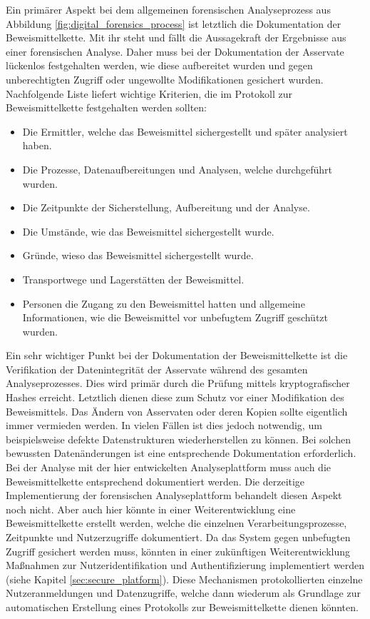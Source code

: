 \noindent
Ein primärer Aspekt bei dem allgemeinen forensischen Analyseprozess aus Abbildung \ref{fig:digital_forensics_process} ist letztlich die Dokumentation der Beweismittelkette. Mit ihr steht und fällt die Aussagekraft der Ergebnisse aus einer forensischen Analyse. Daher muss bei der Dokumentation der Asservate lückenlos festgehalten werden, wie diese aufbereitet wurden und gegen unberechtigten Zugriff oder ungewollte Modifikationen gesichert wurden. Nachfolgende Liste liefert wichtige Kriterien, die im Protokoll zur Beweismittelkette festgehalten werden sollten:
\begin{itemize}
\item Die Ermittler, welche das Beweismittel sichergestellt und später analysiert haben.
\item Die Prozesse, Datenaufbereitungen und Analysen, welche durchgeführt wurden.
\item Die Zeitpunkte der Sicherstellung, Aufbereitung und der Analyse.
\item Die Umstände, wie das Beweismittel sichergestellt wurde.
\item Gründe, wieso das Beweismittel sichergestellt wurde.
\item Transportwege und Lagerstätten der Beweismittel.
\item Personen die Zugang zu den Beweismittel hatten und allgemeine Informationen, wie die Beweismittel vor unbefugtem Zugriff geschützt wurden.
\end{itemize}

\noindent
Ein sehr wichtiger Punkt bei der Dokumentation der Beweismittelkette ist die Verifikation der Datenintegrität der Asservate während des gesamten Analyseprozesses. Dies wird primär durch die Prüfung mittels kryptografischer Hashes erreicht. Letztlich dienen diese zum Schutz vor einer Modifikation des Beweismittels. Das Ändern von Asservaten oder deren Kopien sollte eigentlich immer vermieden werden. In vielen Fällen ist dies jedoch notwendig, um beispielsweise defekte Datenstrukturen wiederherstellen zu können. Bei solchen bewussten Datenänderungen ist eine entsprechende Dokumentation erforderlich.\\ 

\noindent
Bei der Analyse mit der hier entwickelten Analyseplattform muss auch die Beweismittelkette entsprechend dokumentiert werden. Die derzeitige Implementierung der forensischen Analyseplattform behandelt diesen Aspekt noch nicht. Aber auch hier könnte in einer Weiterentwicklung eine Beweismittelkette erstellt werden, welche die einzelnen Verarbeitungsprozesse, Zeitpunkte und Nutzerzugriffe dokumentiert. Da das System gegen unbefugten Zugriff gesichert werden muss, könnten in einer zukünftigen Weiterentwicklung Maßnahmen zur Nutzeridentifikation und Authentifizierung implementiert werden (siehe Kapitel \ref{sec:secure_platform}). Diese Mechanismen protokollierten einzelne Nutzeranmeldungen und Datenzugriffe, welche dann wiederum als Grundlage zur automatischen Erstellung eines Protokolls zur Beweismittelkette dienen könnten.\\

